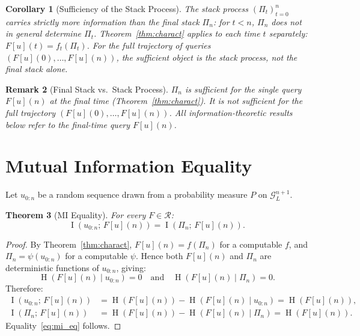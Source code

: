 \documentclass[lettersize,journal]{IEEEtran}
\newtheorem{theorem}{Theorem}
\newtheorem{corollary}[theorem]{Corollary}
\newtheorem{remark}[theorem]{Remark}
\newcommand{\cR}{\mathcal{R}}
\newcommand{\stack}{\Pi}
\newcommand{\GL}{\mathcal{G}_L}
\DeclareMathOperator{\MI}{I}
\DeclareMathOperator{\En}{H}
\begin{document}
\begin{corollary}[Sufficiency of the Stack Process]
\label{cor:suff_process}
The stack process $(\stack_t)_{t=0}^n$ carries strictly more
information than the final stack $\stack_n$: for $t < n$, $\stack_n$
does not in general determine $\stack_t$.
Theorem~\ref{thm:charact} applies to each time $t$ separately:
$F[u](t) = f_t(\stack_t)$.
For the full trajectory of queries $(F[u](0),\ldots,F[u](n))$,
the sufficient object is the stack \emph{process}, not the final
stack alone.
\end{corollary}

\begin{remark}[Final Stack vs.\ Stack Process]
\label{rem:final_vs_process}
$\stack_n$ is sufficient for the single query $F[u](n)$ at the
\emph{final} time (Theorem~\ref{thm:charact}).
It is not sufficient for the full trajectory
$(F[u](0),\ldots,F[u](n))$.
All information-theoretic results below refer to the
\emph{final-time} query $F[u](n)$.
\end{remark}

\section{Mutual Information Equality}
\label{sec:mi}

Let $u_{0:n}$ be a random sequence drawn from a probability measure
$P$ on $\GL^{n+1}$.
\IEEEpubidadjcol

\begin{theorem}[MI Equality]
\label{thm:mi}
For every $F \in \cR$:
\begin{equation}
  \MI(u_{0:n};\, F[u](n)) = \MI(\stack_n;\, F[u](n)).
  \label{eq:mi_eq}
\end{equation}
\end{theorem}

\begin{proof}
By Theorem~\ref{thm:charact}, $F[u](n) = f(\stack_n)$ for a
computable $f$, and $\stack_n = \psi(u_{0:n})$ for a computable
$\psi$.
Hence both $F[u](n)$ and $\stack_n$ are deterministic functions of
$u_{0:n}$, giving:
\begin{equation*}
  \En(F[u](n) \mid u_{0:n}) = 0
  \quad\text{and}\quad
  \En(F[u](n) \mid \stack_n) = 0.
\end{equation*}
Therefore:
\begin{align*}
  \MI(u_{0:n};\,F[u](n))
    &= \En(F[u](n)) - \En(F[u](n)\mid u_{0:n})
     = \En(F[u](n)),\\
  \MI(\stack_n;\,F[u](n))
    &= \En(F[u](n)) - \En(F[u](n)\mid \stack_n)
     = \En(F[u](n)).
\end{align*}
Equality~\eqref{eq:mi_eq} follows.
\end{proof}
\end{document}
